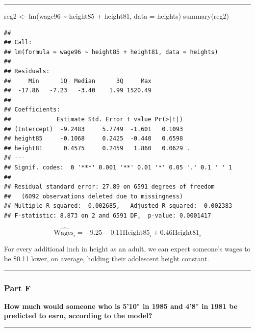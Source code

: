 \documentclass[
]{article}
\newenvironment{Shaded}{\begin{snugshade}}{\end{snugshade}}
\newcommand{\AttributeTok}[1]{\textcolor[rgb]{0.77,0.63,0.00}{#1}}
\newcommand{\FunctionTok}[1]{\textcolor[rgb]{0.00,0.00,0.00}{#1}}
\newcommand{\NormalTok}[1]{#1}
\newcommand{\OtherTok}[1]{\textcolor[rgb]{0.56,0.35,0.01}{#1}}
\newcommand{\SpecialCharTok}[1]{\textcolor[rgb]{0.00,0.00,0.00}{#1}}
\begin{document}
\begin{center}\rule{0.5\linewidth}{0.5pt}\end{center}

\begin{Shaded}
\begin{Highlighting}[]
\NormalTok{reg2 }\OtherTok{\textless{}{-}} \FunctionTok{lm}\NormalTok{(wage96 }\SpecialCharTok{\textasciitilde{}}\NormalTok{ height85 }\SpecialCharTok{+}\NormalTok{ height81, }\AttributeTok{data =}\NormalTok{ heights)}
\FunctionTok{summary}\NormalTok{(reg2)}
\end{Highlighting}
\end{Shaded}

\begin{verbatim}
## 
## Call:
## lm(formula = wage96 ~ height85 + height81, data = heights)
## 
## Residuals:
##     Min      1Q  Median      3Q     Max 
##  -17.86   -7.23   -3.40    1.99 1520.49 
## 
## Coefficients:
##             Estimate Std. Error t value Pr(>|t|)  
## (Intercept)  -9.2483     5.7749  -1.601   0.1093  
## height85     -0.1068     0.2425  -0.440   0.6598  
## height81      0.4575     0.2459   1.860   0.0629 .
## ---
## Signif. codes:  0 '***' 0.001 '**' 0.01 '*' 0.05 '.' 0.1 ' ' 1
## 
## Residual standard error: 27.89 on 6591 degrees of freedom
##   (6092 observations deleted due to missingness)
## Multiple R-squared:  0.002685,   Adjusted R-squared:  0.002383 
## F-statistic: 8.873 on 2 and 6591 DF,  p-value: 0.0001417
\end{verbatim}

\[\widehat{\text{Wages}_i}=-9.25-0.11\text{Height85}_i+0.46\text{Height81}_i\]

For every additional inch in height as an adult, we can expect someone's
wages to be \$0.11 lower, on average, holding their adolescent height
constant.

\begin{center}\rule{0.5\linewidth}{0.5pt}\end{center}

\hypertarget{part-f-1}{%
\subsubsection{Part F}\label{part-f-1}}

\textbf{How much would someone who is 5'10" in 1985 and 4'8" in 1981 be
predicted to earn, according to the model?}

\begin{center}\rule{0.5\linewidth}{0.5pt}\end{center}
\end{document}
